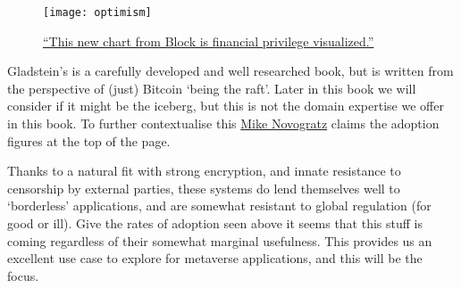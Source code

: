 \begin{figure*}[ht]\centering %
	\texttt{[image: optimism]}
	\caption{\href{https://twitter.com/gladstein/status/1532054253673406464}{``This new chart from Block is financial privilege visualized.''}}
	\label{fig:optimism}
\end{figure*}
Gladstein's is a carefully developed and well researched book, but is written from the perspective of (just) Bitcoin `being the raft'. Later in this book we will consider if it might be the iceberg, but this is not the domain expertise we offer in this book. To further contextualise this \href{https://www.youtube.com/watch?v=BRQIMjZLMDk}{Mike Novogratz} claims the adoption figures at the top of the page.%

Thanks to a natural fit with strong encryption, and innate resistance to censorship by external parties, these systems do lend themselves well to `borderless' applications, and are somewhat resistant to global regulation (for good or ill). Give the rates of adoption seen above it seems that this stuff is coming regardless of their somewhat marginal usefulness. This provides us an excellent use case to explore for metaverse applications, and this will be the focus.
